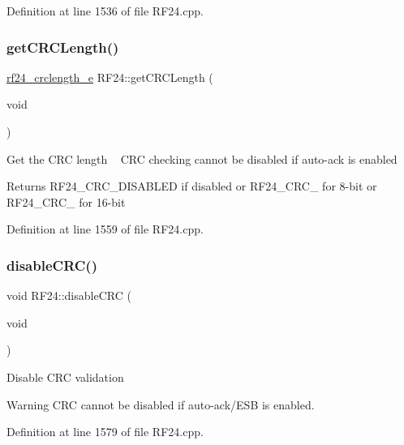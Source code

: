 Definition at line 1536 of file R\+F24.\+cpp.

\mbox{\label{classRF24_aba4ca91b829afcd94a4c11e0343e3796}} 
\subsubsection{\texorpdfstring{get\+C\+R\+C\+Length()}{getCRCLength()}}
{\footnotesize\ttfamily \hyperlink{RF24_8h_adbe00719f3f835c82bd007081d040a7e}{rf24\+\_\+crclength\+\_\+e} R\+F24\+::get\+C\+R\+C\+Length (\begin{DoxyParamCaption}\item[{void}]{ }\end{DoxyParamCaption})}

Get the C\+RC length ~\newline
C\+RC checking cannot be disabled if auto-\/ack is enabled \begin{DoxyReturn}{Returns}
R\+F24\+\_\+\+C\+R\+C\+\_\+\+D\+I\+S\+A\+B\+L\+ED if disabled or R\+F24\+\_\+\+C\+R\+C\+\_ for 8-\/bit or R\+F24\+\_\+\+C\+R\+C\+\_ for 16-\/bit 
\end{DoxyReturn}


Definition at line 1559 of file R\+F24.\+cpp.

\mbox{\label{classRF24_a5eacd9ecfbc19864801d714c292cf8be}} 
\subsubsection{\texorpdfstring{disable\+C\+R\+C()}{disableCRC()}}
{\footnotesize\ttfamily void R\+F24\+::disable\+C\+RC (\begin{DoxyParamCaption}\item[{void}]{ }\end{DoxyParamCaption})}

Disable C\+RC validation

\begin{DoxyWarning}{Warning}
C\+RC cannot be disabled if auto-\/ack/\+E\+SB is enabled. 
\end{DoxyWarning}


Definition at line 1579 of file R\+F24.\+cpp.

\mbox{\label{classRF24_abf68b9b0c9cd17179e9e144c3e7f9c45}} 
